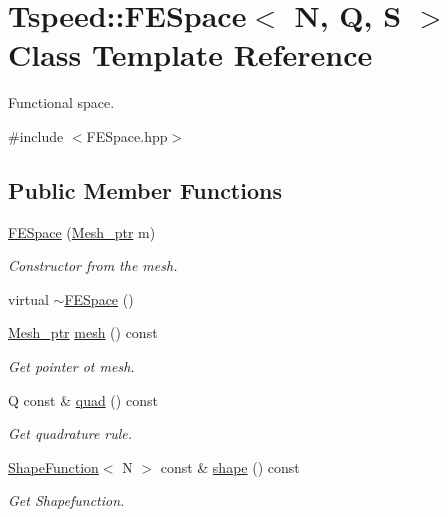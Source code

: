 \hypertarget{classTspeed_1_1FESpace}{\section{Tspeed\-:\-:F\-E\-Space$<$ N, Q, S $>$ Class Template Reference}
\label{classTspeed_1_1FESpace}
}


Functional space.  




{\ttfamily \#include $<$F\-E\-Space.\-hpp$>$}

\subsection*{Public Member Functions}
\begin{DoxyCompactItemize}
\item 
\hyperlink{classTspeed_1_1FESpace_aecf45c5fb39b7df60599d2d055c9506d}{F\-E\-Space} (\hyperlink{namespaceTspeed_a7367a01365c4cc2c1a09305b3effc4e8}{Mesh\-\_\-ptr} m)
\begin{DoxyCompactList}\small\item\em Constructor from the mesh. \end{DoxyCompactList}\item 
virtual \hyperlink{classTspeed_1_1FESpace_ae1f9e4f07e24640e68a138c1d11ad900}{$\sim$\-F\-E\-Space} ()
\item 
\hyperlink{namespaceTspeed_a7367a01365c4cc2c1a09305b3effc4e8}{Mesh\-\_\-ptr} \hyperlink{classTspeed_1_1FESpace_a52581134e398195d098ad4f1985a4cbb}{mesh} () const 
\begin{DoxyCompactList}\small\item\em Get pointer ot mesh. \end{DoxyCompactList}\item 
Q const \& \hyperlink{classTspeed_1_1FESpace_a118bd2d5becbd61c593efa546a525992}{quad} () const 
\begin{DoxyCompactList}\small\item\em Get quadrature rule. \end{DoxyCompactList}\item 
\hyperlink{classTspeed_1_1ShapeFunction}{Shape\-Function}$<$ N $>$ const \& \hyperlink{classTspeed_1_1FESpace_ac9829cde89c0e1a5252925c1e9322d47}{shape} () const 
\begin{DoxyCompactList}\small\item\em Get Shapefunction. \end{DoxyCompactList}\item 

\end{DoxyCompactItemize}
